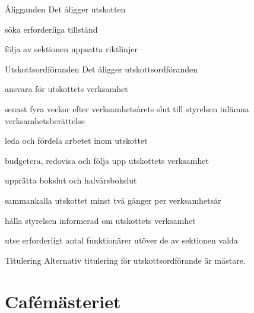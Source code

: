\documentclass[pdfbookmarks,a4paper,11pt]{article}
\newlength{\itemcollength}
\newenvironment{reglemlista}{%
  \begin{list}{}{%
      \setlength{\labelwidth}{\itemcollength}%
      \setlength{\leftmargin}{\labelwidth + \labelsep}%
      \renewcommand{\makelabel}[1]{%
        \raisebox{0pt}[1ex][0pt]{%
          \makebox[\labelwidth][l]{%
            \parbox[t]{\itemcollength}{%
              \raggedright\hspace{0pt}##1}}}\hfill}%
      }}{%
  \end{list}}
\begin{document}
\begin{reglemlista}

  \item[Åligganden]
    Det åligger utskotten
    \begin{attlista}
      \item söka erforderliga tillstånd
      \item följa av sektionen uppsatta riktlinjer
    \end{attlista}

  \item[Utskottsordföranden]
    Det åligger utskottsordföranden
    \begin{attlista}
      \item ansvara för utskottets verksamhet
      \item senast fyra veckor efter verksamhetsårets slut till styrelsen inlämna verksamhetsberättelse
      \item leda och fördela arbetet inom utskottet
      \item budgetera, redovisa och följa upp utskottets verksamhet
      \item upprätta bokslut och halvårsbokslut
      \item sammankalla utskottet minst två gånger per verksamhetsår
      \item hålla styrelsen informerad om utskottets verksamhet
      \item utse erforderligt antal funktionärer utöver de av sektionen valda
    \end{attlista}
	
	\item[Titulering]
	Alternativ titulering för utskottsordförande är mästare.

\end{reglemlista}



\section{Cafémästeriet}
\end{document}
